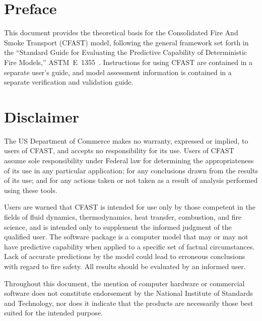 \documentclass[12pt,twoside]{book}
\begin{document}
\newpage

\frontmatter

\pagestyle{plain}
\setcounter{page}{3}

%
%

\chapter{Preface}

This document provides the theoretical basis for the Consolidated Fire And Smoke Transport (CFAST) model, following the general framework set forth in the ``Standard Guide for Evaluating the Predictive Capability of Deterministic Fire Models,'' ASTM~E~1355~\cite{ASTM:E1355}. Instructions for using CFAST are contained in a separate user's guide, and model assessment information is contained in a separate verification and validation guide.

%
%

\chapter{Disclaimer}

The US Department of Commerce makes no warranty, expressed or implied, to users of CFAST, and accepts no responsibility for its use. Users of CFAST assume sole responsibility under Federal law for determining the appropriateness of its use in any particular application; for any conclusions drawn from the results of its use; and for any actions taken or not taken as a result of analysis performed using these tools.

Users are warned that CFAST is intended for use only by those competent in the fields of fluid dynamics, thermodynamics, heat transfer, combustion, and fire science, and is intended only to supplement the informed judgment of the qualified user. The software package is a computer model that may or may not have predictive capability when applied to a specific set of factual circumstances. Lack of accurate predictions by the model could lead to erroneous conclusions with regard to fire safety. All results should be evaluated by an informed user.

Throughout this document, the mention of computer hardware or commercial software does not constitute endorsement by the National Institute of Standards and Technology, nor does it indicate that the products are necessarily those best suited for the intended purpose.
\end{document}
